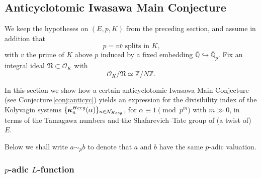 \documentclass[10pt,reqno]{amsart}
\numberwithin{equation}{section}
\theoremstyle{plain}
\theoremstyle{definition}
\newtheorem{rmk}[thm]{Remark}
\theoremstyle{definition}
\theoremstyle{plain}
\theoremstyle{plain}
\theoremstyle{plain}
\theoremstyle{plain}
\theoremstyle{plain}
\theoremstyle{plain}
\newcommand{\Z}{\mathbb{Z}}
\newcommand{\Q}{\mathbb{Q}}
\newcommand{\bkappa}{\boldsymbol{\kappa}}
\newcommand{\cN}{\mathcal{N}}
\begin{document}


\subsection{Anticyclotomic Iwasawa Main Conjecture}

We keep the hypotheses on $(E,p,K)$ from the preceding section, and assume in addition that
\begin{equation}\label{eq:intro-spl}
\textrm{$p=v\bar{v}$ splits in $K$,}\tag{spl}
\end{equation}
with $v$ the prime of $K$ above $p$ induced by a fixed embedding $\overline{\Q}\hookrightarrow\overline{\Q}_p$.  Fix an integral ideal $\mathfrak{N}\subset\mathcal{O}_K$ with 
\begin{equation}\label{eq:N}
\mathcal{O}_K/\mathfrak{N}\simeq\Z/N\Z.\nonumber
\end{equation}

In this section we show how a certain anticyclotomic Iwasawa Main Conjecture (see Conjecture\,\ref{conj:anticyc}) yields an expression for the divisibility index of 
the Kolyvagin systems
$\{\bkappa_n^{\rm Heeg}(\alpha)\}_{n\in \cN_{\rm Heeg}}$, for $\alpha\equiv 1 \pmod{p^m}$ with $m\gg 0$, in terms of the Tamagawa numbers and the Shafarevich--Tate group of (a twist of) $E$. 

Below we shall write $a\sim_p b$ to denote that $a$ and $b$ have the same $p$-adic valuation.




%
\subsubsection{$p$-adic $L$-function} 
\end{document}
